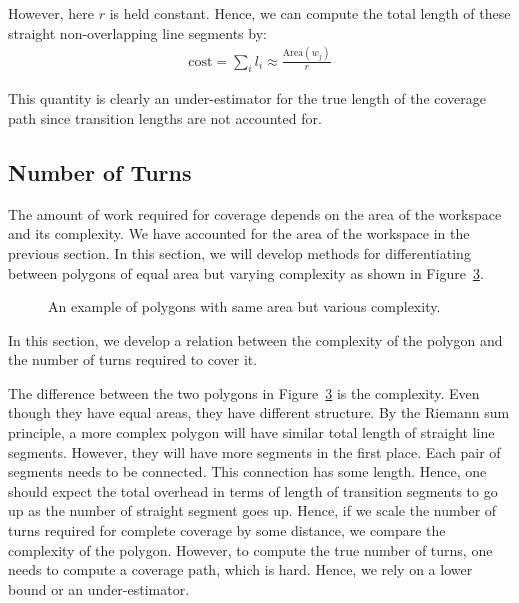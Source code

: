 \documentclass[../main.tex]{subfiles}
\begin{document}
However, here $r$ is held constant. Hence, we can compute the total length of these straight non-overlapping line segments by:
\begin{equation}
\begin{aligned}
		\text{cost}=\sum_{i}l_i\approx\frac{\text{Area}(w_j)}{r}
\end{aligned}
\end{equation}

This quantity is clearly an under-estimator for the true length of the coverage path since transition lengths are not accounted for.


\subsection{Number of Turns}
The amount of work required for coverage depends on the area of the workspace and its complexity. We have accounted for the area of the workspace in the previous section. In this section, we will develop methods for differentiating between polygons of equal area but varying complexity as shown in Figure~\ref{fig:area_complexity}.

\begin{figure}
	\centering
	\begin{subfigure}{0.5\linewidth}
		\centering
		\caption{\label{fig:area_complexity_i}}
	\end{subfigure}%
	\begin{subfigure}{0.5\linewidth}
		\centering
		
		\caption{\label{fig:area_complexity_ii}}
	\end{subfigure}
	\caption{An example of polygons with same area but various complexity.}
	\label{fig:area_complexity}
\end{figure}

In this section, we develop a relation between the complexity of the polygon and the number of turns required to cover it.

The difference between the two polygons in Figure~\ref{fig:area_complexity} is the complexity. Even though they have equal areas, they have different structure. By the Riemann sum principle, a more complex polygon will have similar total length of straight line segments. However, they will have more segments in the first place. Each pair of segments needs to be connected. This connection has some length. Hence, one should expect the total overhead in terms of length of transition segments to go up as the number of straight segment goes up. Hence, if we scale the number of turns required for complete coverage by some distance, we compare the complexity of the polygon. However, to compute the true number of turns, one needs to compute a coverage path, which is hard. Hence, we rely on a lower bound or an under-estimator.
\end{document}
